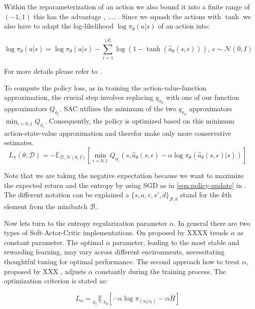 Within the reparameterization of an action we also bound it into a finite range of $(-1, 1)$ this has the advantage , .... . Since we squash the actions with $\tanh$ we also have to adapt the log-likelihood $\log \pi_\theta(a|s)$ of an action into:

\begin{equation*}
	\log \pi_\theta(a|s) = \log \pi_\theta(a|s) - \sum_{i=1}^{|\mathcal{A}|} \log(1 - \tanh(\hat{a}_\theta(s, \epsilon))), \ \epsilon \sim \mathcal{N}(0, I)
\end{equation*}

For more details please refer to .

To compute the policy loss, as in training the action-value-function approximation, the crucial step involves replacing $q_{\pi_\theta}$ with one of our function approximators $Q_{\phi_i}$. SAC utilizes the minimum of the two $q_{\pi_\theta}$ approximators $\min_{i=0,1} Q_{\phi_i}$. Consequently, the policy is optimized based on this minimum action-state-value approximation and therefor make only more conservative estimates.
\begin{equation}\label{eqn:policy-loss}
	L_\pi(\theta, \mathcal{D}) = - \mathbb{E}_{\mathcal{D}, \mathcal{N}(0, I)}\left[\min_{i=0,1}Q_{\phi_i}(s, \hat{a}_\theta(s, \epsilon) - \alpha \log \pi_\theta(\hat{a}_\theta(s, \epsilon)| s))\right]
\end{equation}

Note that we are taking the negative expectation because we want to maximize the expected return and the entropy by using SGD as in \eqref{eqn:policy-update} in . The different notation can be explained a ${\{s, a, r, s', d\}}_{\mathcal{B}, k}$ stand for the $k$th element from the minibatch $\mathcal{B}$..

Now lets turn to the entropy regularization parameter $\alpha$. In general there are two types of Soft-Actor-Critic implementations. On proposed by XXXX  treads $\alpha$ as constant parameter.  The optimal $\alpha$ parameter, leading to the most stable and rewarding learning, may vary across different environments, necessitating thoughtful tuning for optimal performance.
The second approach how to treat $\alpha$, proposed by XXX , adjusts $\alpha$ constantly during the training process. The optimization criterion is stated as:

\begin{equation}\label{eqn:alpha-criterion}
	L_\alpha = \underset{a_t\sim\pi_\theta}{\mathbb{E}}\left[-\alpha \log \pi_(a_t|s_t) - \alpha \bar{H}\right]
\end{equation}

